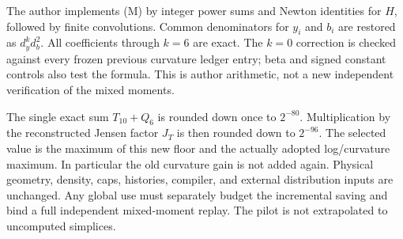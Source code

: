 The author implements (M) by integer power sums and Newton identities
for $H$, followed by finite convolutions. Common denominators for
$y_i$ and $b_i$ are restored as $d_y^k d_b^2$. All coefficients through
$k=6$ are exact. The $k=0$ correction is checked against every frozen
previous curvature ledger entry; beta and signed constant controls
also test the formula. This is author arithmetic, not a new independent
verification of the mixed moments.

The single exact sum $T_{10}+Q_6$ is rounded down once to $2^{-80}$.
Multiplication by the reconstructed Jensen factor $J_T$ is then
rounded down to $2^{-96}$. The selected value is the maximum of this
new floor and the actually adopted log/curvature maximum. In particular
the old curvature gain is not added again. Physical geometry, density,
caps, histories, compiler, and external distribution inputs are unchanged.
Any global use must separately budget the incremental saving and bind
a full independent mixed-moment replay. The pilot is not extrapolated
to uncomputed simplices.
